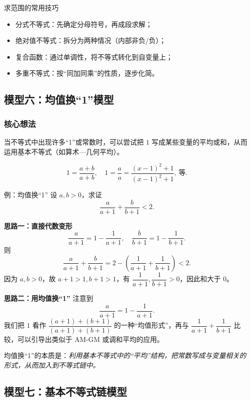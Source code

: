 \documentclass[a4paper,11pt]{ctexart}
\begin{document}
\begin{summarybox}{求范围的常用技巧}
\begin{itemize}
  \item 分式不等式：先确定分母符号，再成段求解；
  \item 绝对值不等式：拆分为两种情况（内部非负/负）；
  \item 复合函数：通过单调性，将不等式转化到自变量上；
  \item 多重不等式：按“同加同乘”的性质，逐步化简。
\end{itemize}
\end{summarybox}

\subsection{模型六：均值换“1”模型}

\subsubsection*{核心想法}

当不等式中出现许多“1”或常数时，可以尝试把 $1$ 写成某些变量的平均或和，从而运用基本不等式（如算术—几何平均）。

\[
1=\frac{a+b}{a+b},\quad 1=\frac{a}{a}=\frac{(x-1)^2+1}{(x-1)^2+1},\ \text{等}.
\]

\begin{examplebox}[mathnote coverage=soft]{例：均值换“1”}
设 $a,b>0$，求证
\[
\frac{a}{a+1}+\frac{b}{b+1}<2.
\]

\textbf{思路一：直接代数变形}  
\[
\frac{a}{a+1}=1-\frac{1}{a+1},\quad
\frac{b}{b+1}=1-\frac{1}{b+1}.
\]
则
\[
\frac{a}{a+1}+\frac{b}{b+1}=2-\left(\frac{1}{a+1}+\frac{1}{b+1}\right)<2.
\]
因为 $a,b>0$，故 $a+1>1,b+1>1$，有 $\dfrac{1}{a+1},\dfrac{1}{b+1}>0$，因此和大于 $0$。

\textbf{思路二：用均值换“1”}  
注意到
\[
\frac{a}{a+1}=1-\frac{1}{a+1}.
\]
我们把 $1$ 看作 $\dfrac{(a+1)+(b+1)}{(a+1)+(b+1)}$ 的一种“均值形式”，再与 $\dfrac{1}{a+1}+\dfrac{1}{b+1}$ 比较，可以引导出类似于 AM-GM 或调和平均的应用。
\end{examplebox}

均值换“1”的本质是：\emph{利用基本不等式中的“平均”结构，把常数写成与变量相关的形式，从而加入到不等式链中。}

\subsection{模型七：基本不等式链模型}
\end{document}
